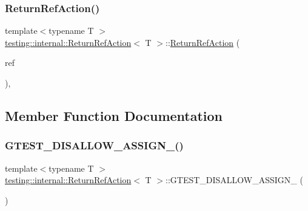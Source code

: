 \subsubsection{\texorpdfstring{ReturnRefAction()}{ReturnRefAction()}\hspace{0.1cm}{\footnotesize\ttfamily [3/3]}}
{\footnotesize\ttfamily template$<$typename T $>$ \\
\mbox{\hyperlink{classtesting_1_1internal_1_1_return_ref_action}{testing\+::internal\+::\+Return\+Ref\+Action}}$<$ T $>$\+::\mbox{\hyperlink{classtesting_1_1internal_1_1_return_ref_action}{Return\+Ref\+Action}} (\begin{DoxyParamCaption}\item[{T \&}]{ref }\end{DoxyParamCaption})\hspace{0.3cm}{\ttfamily [inline]}, {\ttfamily [explicit]}}



\subsection{Member Function Documentation}
\mbox{\label{classtesting_1_1internal_1_1_return_ref_action_a7b26c9c4e02cdf2b82f76f32f8b8e053}} 
\subsubsection{\texorpdfstring{GTEST\_DISALLOW\_ASSIGN\_()}{GTEST\_DISALLOW\_ASSIGN\_()}\hspace{0.1cm}{\footnotesize\ttfamily [1/3]}}
{\footnotesize\ttfamily template$<$typename T $>$ \\
\mbox{\hyperlink{classtesting_1_1internal_1_1_return_ref_action}{testing\+::internal\+::\+Return\+Ref\+Action}}$<$ T $>$\+::G\+T\+E\+S\+T\+\_\+\+D\+I\+S\+A\+L\+L\+O\+W\+\_\+\+A\+S\+S\+I\+G\+N\+\_\+ (\begin{DoxyParamCaption}\item[{\mbox{\hyperlink{classtesting_1_1internal_1_1_return_ref_action}{Return\+Ref\+Action}}$<$ T $>$}]{ }\end{DoxyParamCaption})\hspace{0.3cm}{\ttfamily [private]}}

